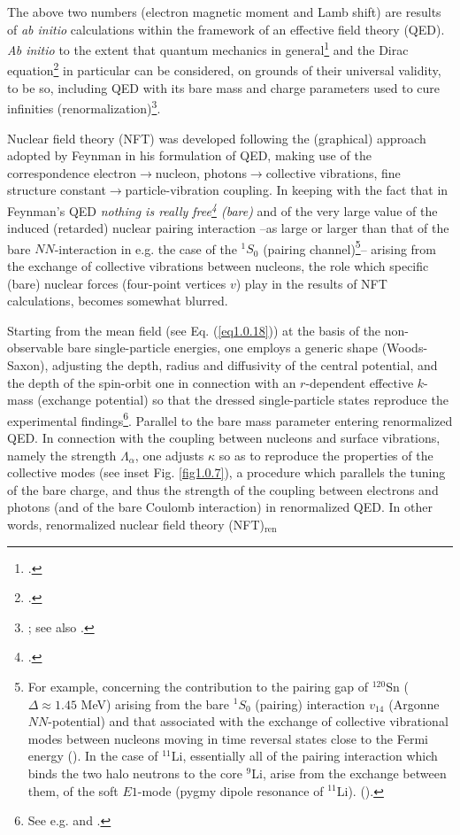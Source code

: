 The above two numbers (electron magnetic moment and Lamb shift) are results of \textit{ab initio} calculations within the framework of an effective field theory (QED). \textit{Ab initio} to the extent that quantum mechanics in general\footnote{\cite{Heisenberg:25,Born:25a,Born:25b,Dirac:25,Schrodinger:26,Born:26,Heisenberg:27,Pauli:25}.} and the Dirac equation\footnote{\cite{Dirac:28a,Dirac:28b}.} in particular can be considered, on grounds of their universal validity, to be so, including QED with its bare mass and charge parameters used to cure infinities (renormalization)\footnote{\cite{Feynman:49,Schwinger:48,Tomonaga:46}; see also \cite{Dyson:49,Schwinger:58,Schweber:94}.}.

Nuclear field theory (NFT) was developed following the (graphical) approach adopted by Feynman in his formulation of QED, making use of the correspondence electron$\to$nucleon, photons$\to$collective vibrations, fine structure constant$\to$particle-vibration coupling. In keeping with the  fact that in Feynman's QED \textit{nothing is really free\footnote{\cite{Feynman:75}.} (bare)} and of the very large value of the induced (retarded) nuclear pairing interaction --as large or larger than that of the bare $NN$-interaction in e.g. the case of the $^1S_0$ (pairing channel)\footnote{For example, concerning the contribution to the pairing gap of $^{120}$Sn ($\Delta\approx1.45$ MeV) arising from the bare $^1S_0$ (pairing) interaction $v_{14}$ (Argonne $NN$-potential) and that associated with the exchange of collective vibrational modes between nucleons moving in time reversal states close to the Fermi energy (\cite{Idini:15}). In the case of $^{11}$Li, essentially all of the pairing interaction which binds the two halo neutrons to the core $^9$Li, arise from the exchange between them, of the soft $E1$-mode (pygmy dipole resonance  of $^{11}$Li). (\cite{Barranco:01,Broglia:19}). }-- arising from the exchange of collective vibrations between nucleons, the role which specific (bare) nuclear forces (four-point vertices $v$) play in the results of NFT calculations, becomes somewhat blurred. 


Starting from the mean field (see Eq. (\ref{eq1.0.18})) at the basis of the non-observable bare single-particle energies, one employs a generic shape (Woods-Saxon), adjusting the depth, radius and diffusivity of the central potential, and the depth of the spin-orbit one in  connection with an $r$-dependent effective $k$-mass (exchange potential) so that the dressed single-particle states reproduce the experimental findings\footnote{See e.g. \cite{Barranco:17} and \cite{Barranco:20}.}. Parallel to the bare mass parameter entering renormalized QED.
In connection with the coupling between nucleons and surface vibrations, namely the strength $\Lambda_\alpha$, one adjusts $\kappa$ so as to reproduce the properties of the collective modes (see inset Fig. \ref{fig1.0.7}), a procedure which parallels the tuning of the bare charge, and thus the strength of the coupling between electrons and photons (and of the bare Coulomb interaction) in renormalized QED. In other words, renormalized nuclear field theory (NFT)$_{\text{ren}}$

